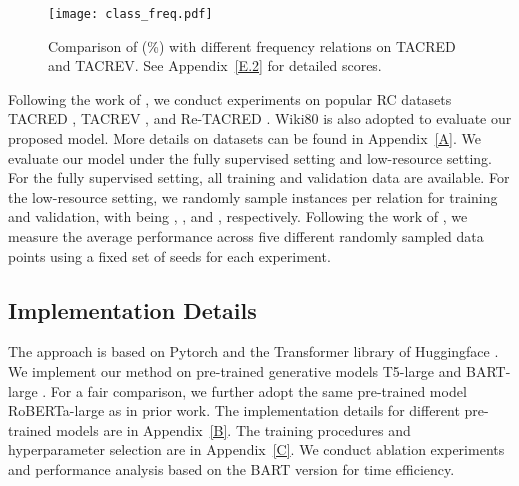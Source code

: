 \documentclass[11pt]{article}
\begin{document}
\begin{figure}[t!]
\centering
\texttt{[image: class\_freq.pdf]}
\caption{Comparison of  (\%) with different frequency relations on TACRED and TACREV. See Appendix~\ref{E.2} for detailed scores.}
\label{class_freq} 
\end{figure}


Following the work of \citet{DBLP:journals/corr/abs-2105-11259, DBLP:journals/corr/abs-2104-07650, DBLP:journals/corr/abs-2102-01373}, we conduct experiments on popular RC datasets TACRED \cite{zhang-etal-2017-position}, TACREV \cite{alt-etal-2020-tacred}, and Re-TACRED \cite{DBLP:conf/aaai/StoicaPP21}. Wiki80 \cite{han-etal-2019-opennre} is also adopted to evaluate our proposed model. More details on datasets can be found in Appendix~\ref{A}. We evaluate our model under the fully supervised setting and low-resource setting. For the fully supervised setting, all training and validation data are available. For the low-resource setting, we randomly sample  instances per relation for training and validation, with  being , , and , respectively. Following the work of \citet{gao-etal-2021-making}, we measure the average performance across five different randomly sampled data points using a fixed set of seeds for each experiment. 

\subsection{Implementation Details}
The approach is  based on Pytorch \cite{DBLP:conf/nips/PaszkeGMLBCKLGA19} and the Transformer library of Huggingface \cite{wolf-etal-2020-transformers}. We implement our method on pre-trained generative models T5-large \cite{DBLP:journals/jmlr/RaffelSRLNMZLL20} and BART-large \cite{lewis-etal-2020-bart}. 
For a fair comparison, we further adopt the same pre-trained model RoBERTa-large \cite{DBLP:journals/corr/abs-1907-11692} as in prior work. The implementation details for different pre-trained models are in Appendix~\ref{B}. The training procedures and hyperparameter selection are in Appendix~\ref{C}. We conduct ablation experiments and performance analysis based on the BART version for time efficiency.

\begin{comment}
\begin{table}
	\centering
	\begin{tabular}{lll}
		\hline
		Parameter & BART&T5 \\
		\hline
		batch size & 16 & 4\\
		learning rate & 3e-5 & 3e-5 \\
		max input len & 512 & 512 \\
		max generate len &10&15\\
		prompt len &3&5\\
		epoch &10&10\\\hline
	\end{tabular}
	\caption{Hyper-parameters of our approach.}
	\label{hyper-parameters}
\end{table}
\end{comment}
\end{document}
